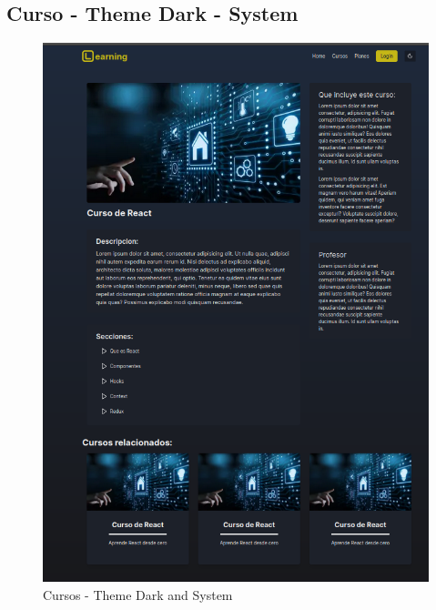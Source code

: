 \subsection{Curso - Theme Dark - System}
  \begin{figure}[H]
    \centering
    \includegraphics[width=1.0\textwidth]{img/CU-D.png}
    \caption{Cursos - Theme Dark and System}
  \end{figure}
